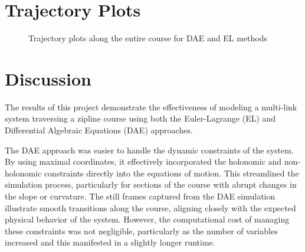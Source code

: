 \documentclass{article}
\begin{document}
\section{Trajectory Plots}
\begin{center}
	\begin{figure}[H]
		\centering
		
		\caption{Trajectory plots along the entire course for DAE and EL methods}%
		\label{fig:example5}%
	\end{figure}
\end{center}
\section{Discussion}
The results of this project demonstrate the effectiveness of modeling a multi-link system traversing a zipline course using both the Euler-Lagrange (EL) and Differential Algebraic Equations (DAE) approaches.

The DAE approach was easier to handle the dynamic constraints of the system. By using maximal coordinates, it effectively incorporated the holonomic and non-holonomic constraints directly into the equations of motion. This streamlined the simulation process, particularly for sections of the course with abrupt changes in the slope or curvature. The still frames captured from the DAE simulation illustrate smooth transitions along the course, aligning closely with the expected physical behavior of the system. However, the computational cost of managing these constraints was not negligible, particularly as the number of variables increased and this manifested in a slightly longer runtime.
\end{document}
